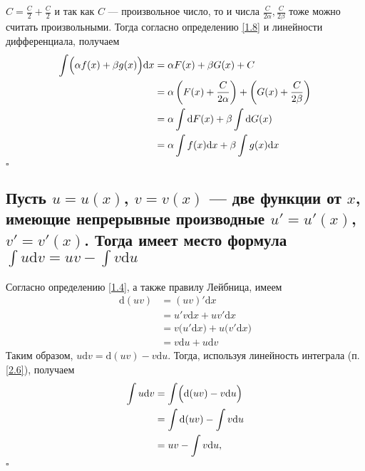 \documentclass[a4paper]{article}
\newcommand{\qed}{\hfill$\square$}
\begin{document}
 $C = \displaystyle\frac{C}{2} + \frac{C}{2}$ и так как $C$ — произвольное число, то и числа $\displaystyle\frac{C}{2\alpha}, \frac{C}{2\beta}$ тоже можно считать произвольными. Тогда согласно определению \ref{1.8} и линейности дифференциала, получаем
$$\begin{aligned}
\int \Bigl(\alpha f(x) + \beta g(x) \Bigr) \mathrm{d}x &= \alpha F(x) + \beta G(x) + C \\
&= \alpha \left( F(x) + \frac{C}{2\alpha} \right) + \left(G(x) + \frac{C}{2\beta} \right) \\
&=\alpha \int \mathrm{d}F(x) + \beta \int \mathrm{d}G(x) \\
&= \alpha \int f(x) \mathrm{d}x + \beta \int g(x) \mathrm{d}x
\end{aligned}$$\qed


\subsection{Пусть $u = u(x)$, $v= v(x)$ — две функции от $x$, имеющие непрерывные производные $u'= u'(x)$, $v' = v'(x)$. Тогда имеет место формула
$\int u \mathrm{d}v = uv - \int v \mathrm{d}u$}
Согласно определению \ref{1.4}, а также правилу Лейбница, имеем 
$$\begin{aligned}
\mathrm{d}(uv) &= (uv)' \mathrm{d}x \\
&= u'v \mathrm{d}x + uv'\mathrm{d}x \\
&= v \bigl( u'\mathrm{d}x\bigr) + u \bigl( v'\mathrm{d}x \bigr) \\
&= v \mathrm{d}u + u \mathrm{d}v
\end{aligned}$$
Таким образом, $u\mathrm{d}v = \mathrm{d}(uv) - v \mathrm{d}u$. Тогда, используя линейность интеграла (п.\ref{2.6}), получаем
$$\begin{aligned}
\int u \mathrm{d}v &= \int \Bigl(  \mathrm{d}(uv) - v \mathrm{d}u \Bigr) \\
&= \int \mathrm{d}(uv) - \int v \mathrm{d}u \\
&= uv - \int v \mathrm{d}u,
\end{aligned}$$\qed
\end{document}
